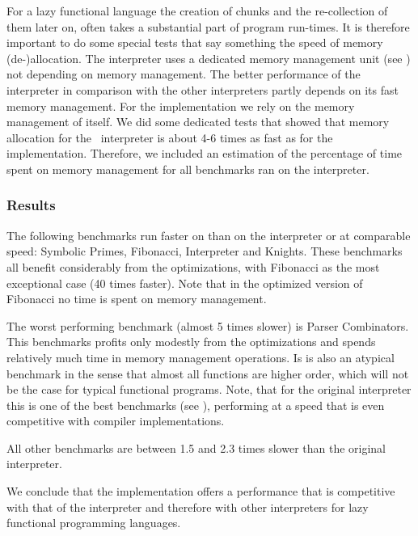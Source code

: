 For a lazy functional language the creation of chunks and the re-collection of them later on, often takes a substantial part of program run-times.
It is therefore important to do some special tests that say something the speed of memory (de-)allocation.
The \Sapl interpreter uses a dedicated memory management unit (see \cite{JKP}) not depending on \Java memory management. 
The better performance of the \Sapl interpreter in comparison with the other interpreters partly depends on its fast memory management.
For the \JS implementation we rely on  the memory management of \JS itself.
We did some dedicated tests that showed that memory allocation for the \Java\ \Sapl interpreter is about 4-6 times as fast as for the \JS implementation.
Therefore, we included an estimation of the percentage of time spent on memory management for all benchmarks ran on  the \Sapljs interpreter.

\subsubsection{Results}
The following benchmarks run faster on \Sapljs than on the \Sapl interpreter or at comparable speed: \textsf{Symbolic Primes}, \textsf{Fibonacci}, \textsf{Interpreter} and \textsf{Knights}. These benchmarks all benefit considerably from the optimizations, with \textsf{Fibonacci} as the most exceptional case (40 times faster).
Note that in the optimized version of \textsf{Fibonacci} no time is spent on memory management.

The worst performing benchmark (almost 5 times slower) is \textsf{Parser Combinators}. 
This benchmarks profits only modestly  from the optimizations and spends relatively much time 
in memory management operations. Is is also an atypical benchmark in the sense that almost all functions are higher order, which will not be the case for
typical functional programs. Note, that for the original \Sapl interpreter this is one of the best benchmarks (see \cite{JKP}), 
performing at a speed that is even competitive with compiler implementations. 

All other benchmarks are between 1.5 and 2.3 times slower than the original \Sapl interpreter.

We conclude that  the \Sapljs implementation offers a performance that is competitive with that of the \Sapl interpreter and therefore
with other interpreters for lazy functional programming languages.


